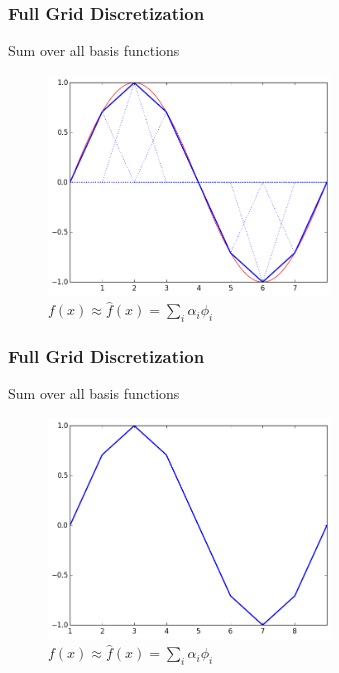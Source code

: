 \begin{frame}
  \frametitle{Full Grid Discretization}
  \topline
  \vspace{-10px}
  \begin{block}{Sum over all basis functions}
    \begin{figure}[!htp]

      \centering
      \includegraphics[width=7.5cm]{images/singlebasis_5}
      \vspace{-12px}
      \caption{$f(x) \approx \hat{f}(x) = \sum_i{\alpha_i \phi_i}$}
    \end{figure}
  \end{block}
\end{frame}

\begin{frame}
  \frametitle{Full Grid Discretization}
  \topline
  \vspace{-10px}
  \begin{block}{Sum over all basis functions}
    \begin{figure}[!htp]

      \centering
      \includegraphics[width=7.5cm]{images/singlebasis_6}
      \vspace{-12px}
      \caption{$f(x) \approx \hat{f}(x) = \sum_i{\alpha_i \phi_i}$}
    \end{figure}
  \end{block}
\end{frame}

